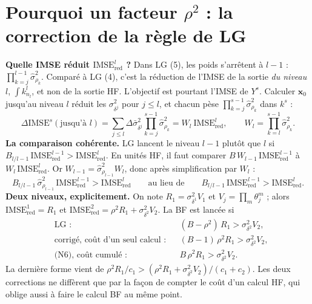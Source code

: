 \documentclass[10pt,a4paper]{article}
\newcommand{\vx}{\bm{x}}
\begin{document}
\section{Pourquoi un facteur $\rho^2$ : la correction de la règle de LG}\label{sec:rho}
\textbf{Quelle IMSE réduit $\mathrm{IMSE}^l_{\mathrm{red}}$ ?} Dans LG (5), les poids s'arrêtent à $l-1$ :
$\prod_{k=j}^{l-1}\hat\sigma^2_{\rho_k}$. Comparé à LG (4), c'est la réduction de l'IMSE de la sortie
\emph{du niveau $l$}, $\int k^l_{n_l}$, et non de la sortie HF. L'objectif est pourtant l'IMSE de $Y^s$.
Calculer $\vx_0$ jusqu'au niveau $l$ réduit les $\sigma^2_{\delta^j}$ pour $j\le l$, et chacun pèse
$\prod_{k=j}^{s-1}\hat\sigma^2_{\rho_k}$ dans $k^s$ :
\[
  \Delta\mathrm{IMSE}^s(\text{jusqu'à }l)=\sum_{j\le l}\Delta\bar\sigma^2_{\delta^j}\prod_{k=j}^{s-1}\hat\sigma^2_{\rho_k}
  =W_l\ \mathrm{IMSE}^l_{\mathrm{red}},\qquad W_l=\prod_{k=l}^{s-1}\hat\sigma^2_{\rho_k}.
\]
\textbf{La comparaison cohérente.} LG lancent le niveau $l-1$ plutôt que $l$ si
$B_{l/l-1}\,\mathrm{IMSE}^{l-1}_{\mathrm{red}}>\mathrm{IMSE}^l_{\mathrm{red}}$. En unités HF, il faut
comparer $B\,W_{l-1}\,\mathrm{IMSE}^{l-1}_{\mathrm{red}}$ à $W_l\,\mathrm{IMSE}^l_{\mathrm{red}}$. Or
$W_{l-1}=\hat\sigma^2_{\rho_{l-1}}W_l$, donc après simplification par $W_l$ :
\[
  \boxed{B_{l/l-1}\,\hat\sigma^2_{\rho_{l-1}}\,\mathrm{IMSE}^{l-1}_{\mathrm{red}}>\mathrm{IMSE}^l_{\mathrm{red}}}
  \qquad\text{au lieu de}\qquad B_{l/l-1}\,\mathrm{IMSE}^{l-1}_{\mathrm{red}}>\mathrm{IMSE}^l_{\mathrm{red}} .
\]
\textbf{Deux niveaux, explicitement.} On note $R_1=\sigma^2_{\delta^1}V_1$ et $V_j=\prod_m\theta_j^m$ ; alors
$\mathrm{IMSE}^1_{\mathrm{red}}=R_1$ et $\mathrm{IMSE}^2_{\mathrm{red}}=\rho^2R_1+\sigma^2_{\delta^2}V_2$.
La BF est lancée si
\begin{align*}
  &\text{LG :} && (B-\rho^2)\,R_1>\sigma^2_{\delta^2}V_2,\\
  &\text{corrigé, coût d'un seul calcul :} && (B-1)\,\rho^2R_1>\sigma^2_{\delta^2}V_2,\\
  &\text{(N6), coût cumulé :} && B\,\rho^2R_1>\sigma^2_{\delta^2}V_2 .
\end{align*}
La dernière forme vient de $\rho^2R_1/c_1>(\rho^2R_1+\sigma^2_{\delta^2}V_2)/(c_1+c_2)$. Les deux
corrections ne diffèrent que par la façon de compter le coût d'un calcul HF, qui oblige aussi à faire le
calcul BF au même point.
\end{document}
